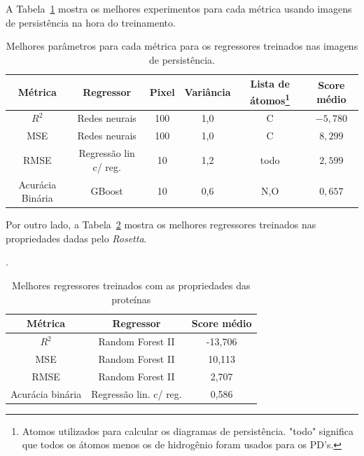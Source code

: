 A Tabela~\ref{tab:bestruns} mostra os melhores experimentos para cada métrica usando imagens de persistência na hora do treinamento.
\begin{table}[!htbp]
    \centering
    \caption{Melhores parâmetros para cada métrica para os regressores treinados nas imagens de persistência.}
    \label{tab:bestruns}
    \begin{tabular}{@{}cccccc@{}}
    \toprule
    \textbf{Métrica} & \textbf{Regressor} & \textbf{Pixel} & \textbf{Variância} &
    \textbf{Lista de átomos}\footnote{Atomos utilizados para calcular os diagramas de persistência. "todo" significa
    que todos os átomos menos os de hidrogênio foram usados para os PD's.}
     & Score médio
    \\
    \midrule
    $R^2$           & Redes neurais     & 100       & 1,0             & C     & $-5,780$ \\
    MSE             & Redes neurais     & 100       & 1,0             & C     &  $8,299$  \\
    RMSE            & Regressão lin c/ reg.   & 10    & 1,2           & todo  &  $2,599$  \\
    Acurácia Binária & GBoost             & 10      & 0,6             & N,O   &  $0,657$  \\
    \bottomrule
    \end{tabular}
\end{table}
Por outro lado, a Tabela~\ref{tab:rosregr} mostra os melhores regressores treinados 
nas propriedades dadas pelo \textit{Rosetta}. 
\begin{table}[!htbp]
    \centering
    \caption{Melhores regressores treinados com as propriedades das proteínas}.
    \label{tab:rosregr}
    \begin{tabular}{@{}ccc@{}}
        \toprule
        \textbf{Métrica} & \textbf{Regressor} & \textbf{Score médio} \\ \midrule
        $R^2$           & Random Forest II       &-13,706        \\
        MSE             & Random Forest II       & 10,113         \\
        RMSE            & Random Forest II        & 2,707          \\
        Acurácia binária & Regressão lin. c/ reg. & 0,586          \\ \bottomrule
    \end{tabular}
\end{table}

